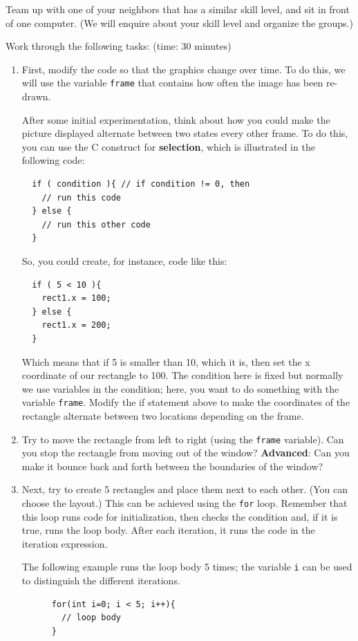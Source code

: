 \begin{steps}
\item Team up with one of your neighbors that has a similar skill level, and sit in front of one computer. (We will enquire about your skill level and organize the groups.)
\item Work through the following tasks: (time: 30 minutes)
  \begin{enumerate}
  \item First, modify the code so that the graphics change over time.
  To do this, we will use the variable \texttt{frame} that contains how often the image has been re-drawn.

  After some initial experimentation, think about how you could make the picture displayed alternate between two states every other frame.
  To do this, you can use the C construct for \textbf{selection}, which is illustrated in the following code:
\begin{lstlisting}
  if ( condition ){ // if condition != 0, then
    // run this code
  } else {
    // run this other code
  }
\end{lstlisting}
  So, you could create, for instance, code like this:
\begin{lstlisting}
  if ( 5 < 10 ){
    rect1.x = 100;
  } else {
    rect1.x = 200;
  }
\end{lstlisting}
Which means that if 5 is smaller than 10, which it is, then set the x coordinate of our rectangle to 100. The condition here is fixed but normally we use variables in the condition;
here, you want to do something with the variable \texttt{frame}.
Modify the if statement above to make the coordinates of the rectangle alternate between two locations depending on the frame.

  \item Try to move the rectangle from left to right (using the \texttt{frame} variable).
  Can you stop the rectangle from moving out of the window?
  \textbf{Advanced}: Can you make it bounce back and forth between the boundaries of the window?

  \item Next, try to create 5 rectangles and place them next to each other. (You can choose the layout.)
  This can be achieved using the \texttt{for} loop.
  Remember that this loop runs code for initialization, then checks the condition and, if it is true, runs the loop body. After each iteration, it runs the code in the iteration expression.

  The following example runs the loop body 5 times; the variable \texttt{i} can be used to distinguish the different iterations.
    \begin{lstlisting}
      for(int i=0; i < 5; i++){
        // loop body
      }
    \end{lstlisting}


\end{enumerate}
\end{steps}
